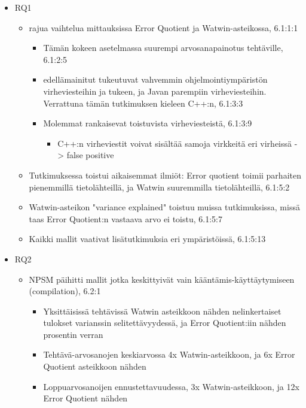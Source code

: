 \documentclass[finnish,twoside,openright]{HYgraduMLDS}
\begin{document}
\begin{itemize}
    \item RQ1
        \begin{itemize}
            \item rajua vaihtelua mittauksissa Error Quotient ja Watwin-asteikossa, 6.1:1:1
            \begin{itemize}
                \item Tämän kokeen asetelmassa suurempi arvosanapainotus tehtäville, 6.1:2:5
                \item edellämainitut tukeutuvat vahvemmin ohjelmointiympäristön virheviesteihin ja tukeen, ja Javan parempiin virheviesteihin. Verrattuna tämän tutkimuksen kieleen C++:n, 6.1:3:3
                \item Molemmat rankaisevat toistuvista virheviesteistä, 6.1:3:9
                \begin{itemize}
                    \item C++:n virheviestit voivat sisältää samoja virkkeitä eri virheissä -> false positive
                \end{itemize}
            \end{itemize}
            \item Tutkimuksessa toistui aikaisemmat ilmiöt: Error quotient toimii parhaiten pienemmillä tietolähteillä, ja Watwin suuremmilla tietolähteillä, 6.1:5:2
            \item Watwin-asteikon "variance explained" toistuu muissa tutkimuksissa, missä taas Error Quotient:n vastaava arvo ei toistu, 6.1:5:7
            \item Kaikki mallit vaativat lisätutkimuksia eri ympäristöissä, 6.1:5:13
        \end{itemize}
    \item RQ2
    \begin{itemize}
        \item NPSM päihitti mallit jotka keskittyivät vain kääntämis-käyttäytymiseen (compilation), 6.2:1
        \begin{itemize}
            \item Yksittäisissä tehtävissä Watwin asteikkoon nähden nelinkertaiset tulokset varianssin selitettävyydessä, ja Error Quotient:iin nähden prosentin verran
            \item Tehtävä-arvosanojen keskiarvossa 4x Watwin-asteikkoon, ja 6x Error Quotient asteikkoon nähden
            \item Loppuarvosanoijen ennustettavuudessa, 3x Watwin-asteikkoon, ja 12x Error Quotient nähden

\end{itemize}
\end{itemize}
\end{itemize}
\end{document}
